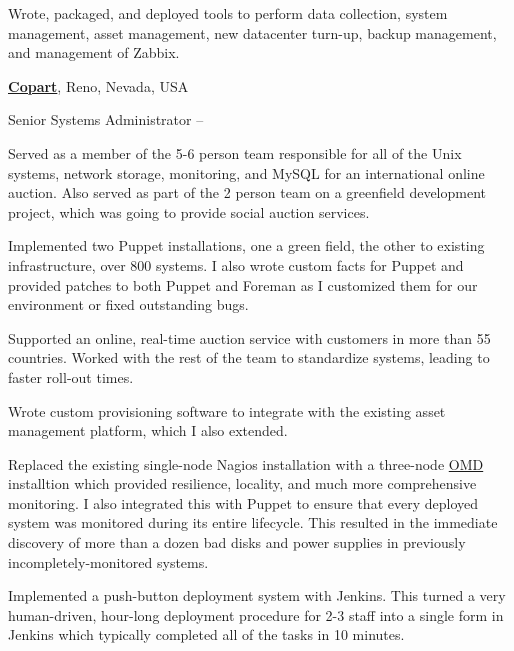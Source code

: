 \documentclass[letterpaper,10pt,oneside]{article}
\begin{document}
\begin{body}
\begin{detail}
\BulletItem Wrote, packaged, and deployed tools to perform data collection,
system management, asset management, new datacenter turn-up, backup
management, and management of Zabbix.

\end{detail}
\EntryGap

\href{http://www.copart.com/}
{\textbf{Copart}},
Reno, Nevada, USA
\par
Senior Systems Administrator
\hfill
{} -- 

\begin{detail}

Served as a member of the 5-6 person team responsible for all of the Unix
systems, network storage, monitoring, and MySQL for an international online
auction.  Also served as part of the 2 person team on a greenfield
development project, which was going to provide social auction services.
  
\BulletItem Implemented two Puppet installations, one a green field, the
other to existing infrastructure, over 800 systems.  I also wrote custom
facts for Puppet and provided patches to both Puppet and Foreman as I
customized them for our environment or fixed outstanding bugs.

\BulletItem Supported an online, real-time auction service with customers
in more than 55 countries.  Worked with the rest of the team to standardize
systems, leading to faster roll-out times.

\BulletItem Wrote custom provisioning software to integrate with the
existing asset management platform, which I also extended.

\BulletItem Replaced the existing single-node Nagios installation with a
three-node \href{http://omdistro.org/}{OMD} installtion which provided
resilience, locality, and much more comprehensive monitoring.  I also
integrated this with Puppet to ensure that every deployed system was
monitored during its entire lifecycle.  This resulted in the immediate
discovery of more than a dozen bad disks and power supplies in previously
incompletely-monitored systems.

\BulletItem Implemented a push-button deployment system with Jenkins.  This
turned a very human-driven, hour-long deployment procedure for 2-3 staff
into a single form in Jenkins which typically completed all of the tasks in
10 minutes.

\end{detail}
\EntryGap



\end{body}
\end{document}
